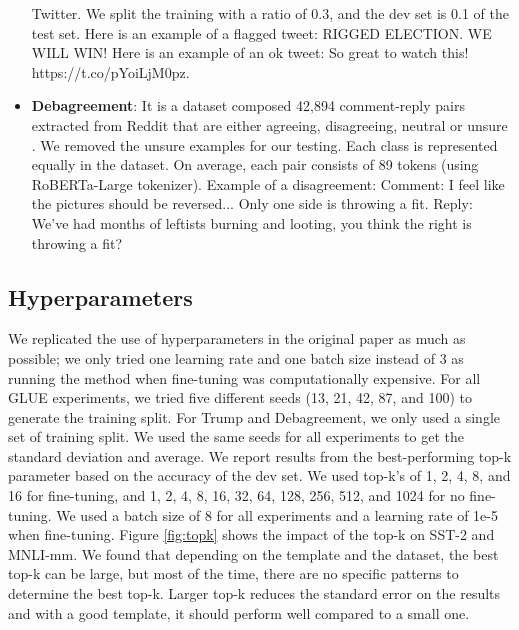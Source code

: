 \begin{itemize}
    Twitter. We split the training with a ratio of 0.3, and the dev set is 0.1 of the test set. \hfill \break \break
    Here is an example of a flagged tweet: RIGGED ELECTION. WE WILL WIN!
    \hfill \break Here is an example of an ok tweet: So great to watch this! https://t.co/pYoiLjM0pz.
    \item \textbf{Debagreement}: It is a dataset composed 42,894 comment-reply pairs extracted from Reddit that are either agreeing, disagreeing, neutral or unsure \citep{pougue2021debagreement}. We removed the unsure examples for our testing. Each class is represented equally in the dataset. On average, each pair consists of 89 tokens (using RoBERTa-Large tokenizer).
    \hfill \break \break
    Example of a disagreement: Comment: I feel like the pictures should be reversed... Only one side is throwing a fit.	\hfill \break Reply: We've had months of leftists burning and looting, you think the right is throwing a fit?
\end{itemize}

\subsection{Hyperparameters}
\label{section:hyper}

We replicated the use of hyperparameters in the original paper as much as possible; we only tried one learning rate and one batch size instead of 3 as running the method when fine-tuning was computationally expensive. For all GLUE experiments, we tried five different seeds (13, 21, 42, 87, and 100) to generate the training split. For Trump and Debagreement, we only used a single set of training split. We used the same seeds for all experiments to get the standard deviation and average. We report results from the best-performing top-k parameter based on the accuracy of the dev set. We used top-k's of 1, 2, 4, 8, and 16 for fine-tuning, and 1, 2, 4, 8, 16, 32, 64, 128, 256, 512, and 1024 for no fine-tuning. We used a batch size of 8 for all experiments and a learning rate of 1e-5 when fine-tuning. Figure \ref{fig:topk} shows the impact of the top-k on SST-2 and MNLI-mm. We found that depending on the template and the dataset, the best top-k can be large, but most of the time, there are no specific patterns to determine the best top-k. Larger top-k reduces the standard error on the results and with a good template, it should perform well compared to a small one.

